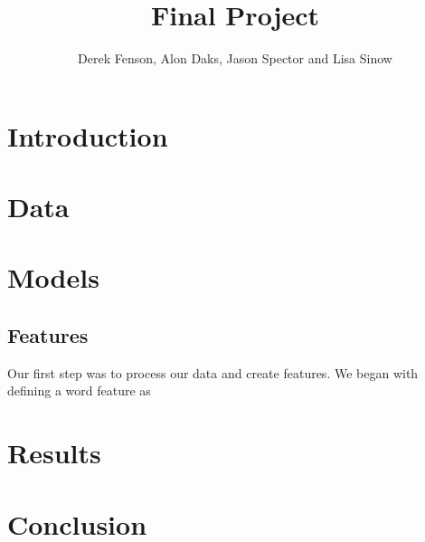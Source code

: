 \documentclass[11pt]{article}
\begin{document}
\title{Final Project}
\author{Derek Fenson, Alon Daks, Jason Spector and Lisa Sinow}
\maketitle




\section{Introduction}



\section{Data}


\section{Models}

\subsection{Features}
Our first step was to process our data and create features. We began with defining a word feature as  


\section{Results}


\section{Conclusion}
\end{document}
